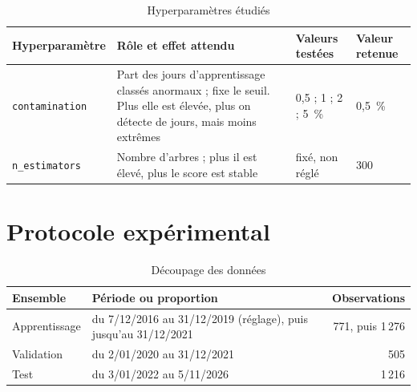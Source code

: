 \documentclass[11pt,a4paper]{article}
\begin{document}
\begin{table}[htbp]
  \centering
  \caption{Hyperparamètres étudiés}
  \label{tab:hyper}
  \small
  \begin{tabular}{@{}l P{6.4cm} l l@{}}
    \toprule
    Hyperparamètre & Rôle et effet attendu & Valeurs testées & Valeur retenue \\
    \midrule
    \texttt{contamination} & Part des jours d'apprentissage classés anormaux ; fixe le seuil. Plus elle est élevée, plus on détecte de jours, mais moins extrêmes & 0,5 ; 1 ; 2 ; 5~\% & 0,5~\% \\
    \texttt{n\_estimators} & Nombre d'arbres ; plus il est élevé, plus le score est stable & fixé, non réglé & 300 \\
    \bottomrule
  \end{tabular}
\end{table}

\section{Protocole expérimental}
\label{sec:protocole}
\begin{table}[htbp]
  \centering
  \caption{Découpage des données}
  \label{tab:decoupage}
  \small
  \begin{tabular}{@{}l l r@{}}
    \toprule
    Ensemble & Période ou proportion & Observations \\
    \midrule
    Apprentissage & du 7/12/2016 au 31/12/2019 (réglage), puis jusqu'au 31/12/2021 & 771, puis 1\,276 \\
    Validation & du 2/01/2020 au 31/12/2021 & 505 \\
    Test & du 3/01/2022 au 5/11/2026 & 1\,216 \\
    \bottomrule
  \end{tabular}
\end{table}
\end{document}
